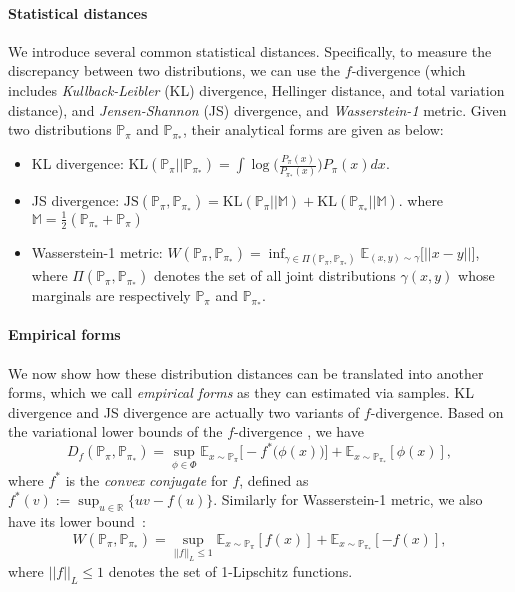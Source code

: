 \paragraph{Statistical distances} 
We introduce several common statistical distances. Specifically, to measure the discrepancy between two distributions, we can use the $f$-divergence (which includes \textit{Kullback-Leibler} (KL) divergence, Hellinger distance, and total variation distance), and \textit{Jensen-Shannon} (JS) divergence, and \textit{Wasserstein-1} metric. Given two distributions $\mathbb{P}_\pi$ and $\mathbb{P}_{\pi_*}$, their analytical forms are given as below:
\begin{itemize}
    \item KL divergence: 
    $\text{KL}(\mathbb{P}_\pi || \mathbb{P}_{\pi_*}) = \int \log\Big( \frac{P_\pi(x)}{P_{\pi_*}(x)} \Big) P_{\pi}(x) dx$.
    
    \item JS divergence:
    $\text{JS}(\mathbb{P}_{\pi}, \mathbb{P}_{\pi_*}) = \text{KL}(\mathbb{P}_\pi || \mathbb{M}) + \text{KL}(\mathbb{P}_{\pi_*} || \mathbb{M})$.  where $\mathbb{M} = \frac{1}{2}(\mathbb{P}_{\pi_*} +\mathbb{P}_{\pi})$ 
    
    \item Wasserstein-1 metric:
    $W(\mathbb{P}_{\pi}, \mathbb{P}_{\pi_*}) = \inf_{\gamma\in\Pi(\mathbb{P}_{\pi}, \mathbb{P}_{\pi_*})} \mathbb{E}_{(x, y)\sim\gamma}\big[ ||x-y|| \big]$, 
    where $\Pi(\mathbb{P}_{\pi}, \mathbb{P}_{\pi_*})$ denotes the set of all joint distributions $\gamma(x, y)$ whose marginals are respectively $\mathbb{P}_{\pi}$ and $\mathbb{P}_{\pi_*}$.
\end{itemize}

\paragraph{Empirical forms} We now show how these distribution distances can be translated into another forms, which we call \textit{empirical forms} as they can estimated via samples. KL divergence and JS divergence are actually two variants of $f$-divergence. Based on the variational lower bounds of the $f$-divergence \citep{nguyen2010estimating}, we have
\begin{equation*}
D_{f} (\mathbb{P}_{\pi}, \mathbb{P}_{\pi_*}) = \sup_{\phi\in \Phi} \mathbb{E}_{x\sim\mathbb{P}_\pi}\big[-f^*\big(\phi(x)\big) \big] + \mathbb{E}_{x\sim\mathbb{P}_{\pi_*}}[\phi(x)],
\end{equation*}
where $f^*$ is the \textit{convex conjugate} for $f$, defined as $f^*(v) := \sup_{u\in\mathbb{R}} \{ uv - f(u) \}$. Similarly for Wasserstein-1 metric, we also have its lower bound~\citep{villani2008optimal}:
\begin{equation*}
W(\mathbb{P}_{\pi}, \mathbb{P}_{\pi_*}) = \sup_{||f||_{L}\leq 1} \mathbb{E}_{x\sim\mathbb{P}_\pi}[f(x)] + \mathbb{E}_{x\sim\mathbb{P}_{\pi_*}}[-f(x)], 
\end{equation*}
where $||f||_{L}\leq 1$ denotes the set of 1-Lipschitz functions.  


